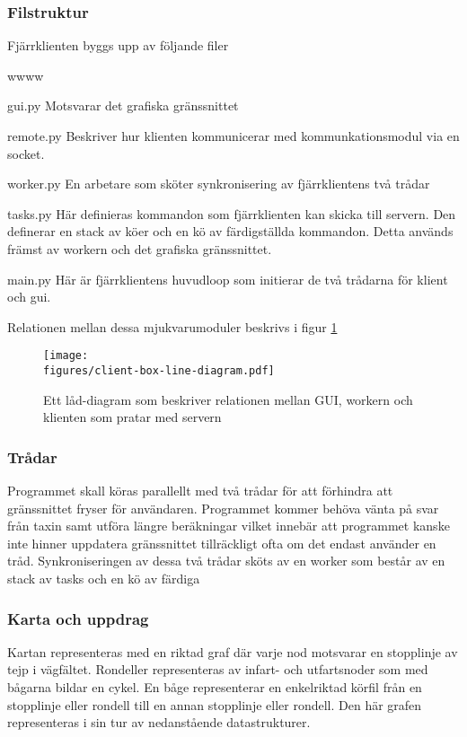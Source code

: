 \documentclass[tekniskrapport/tech.tex]{subfiles}
\begin{document}
\subsubsection{Filstruktur}
Fjärrklienten byggs upp av följande filer

\begin{labeling}{wwww}
	\item[gui.py] 	Motsvarar det grafiska gränssnittet
	
	\item[remote.py] Beskriver hur klienten kommunicerar med
		kommunkationsmodul via en socket.
	
	\item[worker.py] En arbetare som sköter synkronisering av
		fjärrklientens två trådar
	
	\item[tasks.py]	Här definieras kommandon som fjärrklienten kan skicka
		till servern.  Den definerar en stack av köer och en kö av
		färdigställda kommandon.  Detta används främst av workern och
		det grafiska gränssnittet.
	\item[main.py] Här är fjärrklientens huvudloop som initierar de två trådarna
		för klient och gui.
\end{labeling}
Relationen mellan dessa mjukvarumoduler beskrivs i figur \ref{boxclient}

\begin{figure}[h]
\centering
	\texttt{[image: \\figures/client-box-line-diagram.pdf]}
	\caption{Ett låd-diagram som beskriver relationen mellan GUI,
	workern och klienten som pratar med servern}
	\label{boxclient}
\end{figure} 

\subsubsection{Trådar}
Programmet skall köras parallellt med två trådar för att förhindra att
gränssnittet fryser för användaren. Programmet kommer behöva vänta på svar från
taxin samt utföra längre beräkningar vilket innebär att programmet kanske inte
hinner uppdatera gränssnittet tillräckligt ofta om det endast använder en tråd.
Synkroniseringen av dessa två trådar sköts av en worker som består av
en stack av tasks och en kö av färdiga 

\subsubsection{Karta och uppdrag}
Kartan representeras med en riktad graf där varje nod motsvarar en stopplinje
av tejp i vägfältet. Rondeller representeras av infart- och utfartsnoder som
med bågarna bildar en cykel. En båge representerar en enkelriktad körfil från
en stopplinje eller rondell till en annan stopplinje eller rondell. Den här
grafen representeras i sin tur av nedanstående datastrukturer.
\end{document}
